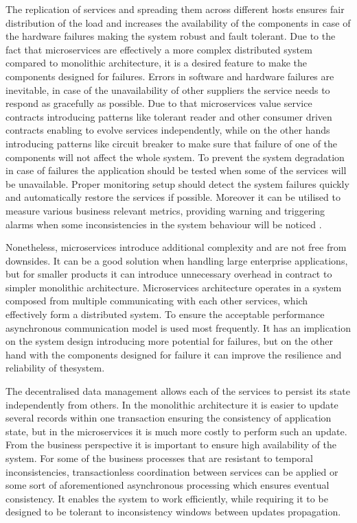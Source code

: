 The replication of services and spreading them across different hosts ensures fair distribution of the load and increases the availability of the components in case of the hardware failures making the system robust and fault tolerant. Due to the fact that microservices are effectively a more complex distributed system compared to monolithic architecture, it is a desired feature to make the components designed for failures. Errors in software and hardware failures are inevitable, in case of the unavailability of other suppliers the service needs to respond as gracefully as possible. Due to that microservices value service contracts introducing patterns like tolerant reader and other consumer driven contracts enabling to evolve services independently, while on the other hands introducing patterns like circuit breaker to make sure that failure of one of the components will not affect the whole system. To prevent the system degradation in case of failures the application should be tested when some of the services will be unavailable. Proper monitoring setup should detect the system failures quickly and automatically restore the services if possible. Moreover it can be utilised to measure various business relevant metrics, providing warning and triggering alarms when some inconsistencies in the system behaviour will be noticed \cite{MicroservicesHowToMakeYourApplicationScale}.

Nonetheless, microservices introduce additional complexity and are not free from downsides. It can be a good solution when handling large enterprise applications, but for smaller products it can introduce unnecessary overhead in contract to simpler monolithic architecture. Microservices architecture operates in a system composed from multiple communicating with each other services, which effectively form a distributed system. To ensure the acceptable performance asynchronous communication model is used most frequently. It has an implication on the system design introducing more potential for failures, but on the other hand with the components designed for failure it can improve the resilience and reliability of thesystem.

The decentralised data management allows each of the services to persist its state independently from others. In the monolithic architecture it is easier to update several records within one transaction ensuring the consistency of application state, but in the microservices it is much more costly to perform such an update. From the business perspective it is important to ensure high availability of the system. For some of the business processes that are resistant to temporal inconsistencies, transactionless coordination between services can be applied or some sort of aforementioned asynchronous processing which ensures eventual consistency. It enables the system to work efficiently, while requiring it to be designed to be tolerant to inconsistency windows between updates propagation.

